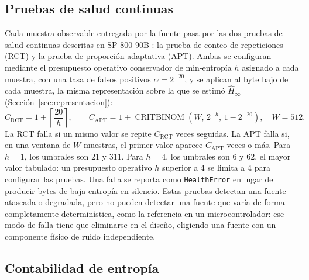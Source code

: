 \subsection{Pruebas de salud continuas}

Cada muestra observable entregada por la fuente pasa por las dos pruebas de salud continuas descritas en SP 800-90B \cite{Turan2018RecommendationGeneration}: la prueba de conteo de repeticiones (RCT) y la prueba de proporción adaptativa (APT). Ambas se configuran mediante el presupuesto operativo conservador de min-entropía $h$ asignado a cada muestra, con una tasa de falsos positivos $\alpha = 2^{-20}$, y se aplican al byte bajo de cada muestra, la misma representación sobre la que se estimó $\hat{H}_\infty$ (Sección~\ref{sec:representacion}):
\begin{equation}
    C_{\text{RCT}} = 1 + \left\lceil \frac{20}{h} \right\rceil, \qquad
    C_{\text{APT}} = 1 + \operatorname{CRITBINOM}\!\left(W,\, 2^{-h},\, 1 - 2^{-20}\right), \quad W = 512.
\end{equation}
La RCT falla si un mismo valor se repite $C_{\text{RCT}}$ veces seguidas. La APT falla si, en una ventana de $W$ muestras, el primer valor aparece $C_{\text{APT}}$ veces o más. Para $h = 1$, los umbrales son 21 y 311. Para $h = 4$, los umbrales son 6 y 62, el mayor valor tabulado: un presupuesto operativo $h$ superior a 4 se limita a 4 para configurar las pruebas. Una falla se reporta como \texttt{HealthError} en lugar de producir bytes de baja entropía en silencio. Estas pruebas detectan una fuente atascada o degradada, pero no pueden detectar una fuente que varía de forma completamente determinística, como la referencia en un microcontrolador: ese modo de falla tiene que eliminarse en el diseño, eligiendo una fuente con un componente físico de ruido independiente.

\subsection{Contabilidad de entropía}

